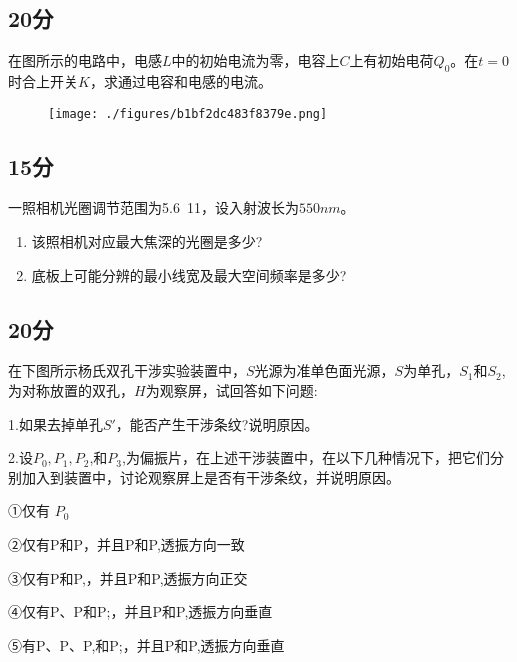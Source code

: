 \subsection{20分}
在图所示的电路中，电感$L$中的初始电流为零，电容上$C$上有初始电荷$Q_0$。在$t=0$时合上开关$K$，求通过电容和电感的电流。
\begin{figure}[ht]
\centering
\texttt{[image: ./figures/b1bf2dc483f8379e.png]}
\caption{} \label{fig_PKU007_1}
\end{figure}
\subsection{15分}
一照相机光圈调节范围为5.6~11，设入射波长为$550nm$。
\begin{enumerate}
\item 该照相机对应最大焦深的光圈是多少?
\item 底板上可能分辨的最小线宽及最大空间频率是多少?
\end{enumerate}
\subsection{20分}
在下图所示杨氏双孔干涉实验装置中，$S$光源为准单色面光源，$S$为单孔，$S_1$和$S_2$,为对称放置的双孔，$H$为观察屏，试回答如下问题:

1.如果去掉单孔$S'$，能否产生干涉条纹?说明原因。

2.设$P_0,P_1,P_2$,和$P_3$,为偏振片，在上述干涉装置中，在以下几种情况下，把它们分别加入到装置中，讨论观察屏上是否有干涉条纹，并说明原因。

①仅有 $P_0$

②仅有P和P，并且P和P,透振方向一致

③仅有P和P,，并且P和P,透振方向正交

④仅有P、P和P;，并且P和P,透振方向垂直

⑤有P、P、P,和P;，并且P和P,透振方向垂直

